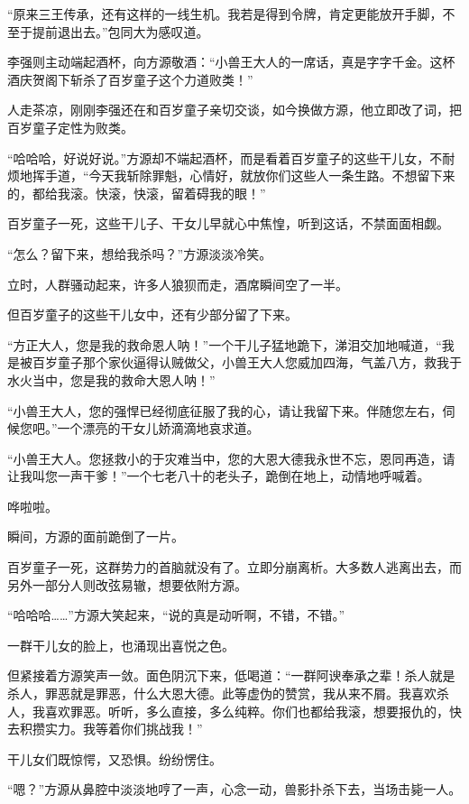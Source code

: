 
\begin{this_body}

“原来三王传承，还有这样的一线生机。我若是得到令牌，肯定更能放开手脚，不至于提前退出去。”包同大为感叹道。

李强则主动端起酒杯，向方源敬酒：“小兽王大人的一席话，真是字字千金。这杯酒庆贺阁下斩杀了百岁童子这个力道败类！”

人走茶凉，刚刚李强还在和百岁童子亲切交谈，如今换做方源，他立即改了词，把百岁童子定性为败类。

“哈哈哈，好说好说。”方源却不端起酒杯，而是看着百岁童子的这些干儿女，不耐烦地挥手道，“今天我斩除罪魁，心情好，就放你们这些人一条生路。不想留下来的，都给我滚。快滚，快滚，留着碍我的眼！”

百岁童子一死，这些干儿子、干女儿早就心中焦惶，听到这话，不禁面面相觑。

“怎么？留下来，想给我杀吗？”方源淡淡冷笑。

立时，人群骚动起来，许多人狼狈而走，酒席瞬间空了一半。

但百岁童子的这些干儿女中，还有少部分留了下来。

“方正大人，您是我的救命恩人呐！”一个干儿子猛地跪下，涕泪交加地喊道，“我是被百岁童子那个家伙逼得认贼做父，小兽王大人您威加四海，气盖八方，救我于水火当中，您是我的救命大恩人呐！”

“小兽王大人，您的强悍已经彻底征服了我的心，请让我留下来。伴随您左右，伺候您吧。”一个漂亮的干女儿娇滴滴地哀求道。

“小兽王大人。您拯救小的于灾难当中，您的大恩大德我永世不忘，恩同再造，请让我叫您一声干爹！”一个七老八十的老头子，跪倒在地上，动情地呼喊着。

哗啦啦。

瞬间，方源的面前跪倒了一片。

百岁童子一死，这群势力的首脑就没有了。立即分崩离析。大多数人逃离出去，而另外一部分人则改弦易辙，想要依附方源。

“哈哈哈……”方源大笑起来，“说的真是动听啊，不错，不错。”

一群干儿女的脸上，也涌现出喜悦之色。

但紧接着方源笑声一敛。面色阴沉下来，低喝道：“一群阿谀奉承之辈！杀人就是杀人，罪恶就是罪恶，什么大恩大德。此等虚伪的赞赏，我从来不屑。我喜欢杀人，我喜欢罪恶。听听，多么直接，多么纯粹。你们也都给我滚，想要报仇的，快去积攒实力。我等着你们挑战我！”

干儿女们既惊愕，又恐惧。纷纷愣住。

“嗯？”方源从鼻腔中淡淡地哼了一声，心念一动，兽影扑杀下去，当场击毙一人。


\end{this_body}
